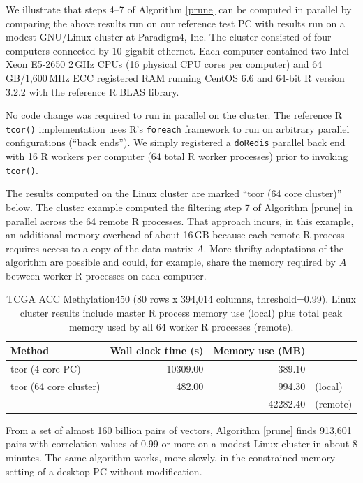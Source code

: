 \documentclass{article}
\let\proglang=\textsf
\numberwithin{algorithmctr}{section}
\begin{document}
We illustrate that steps 4--7 of Algorithm \ref{prune} can be computed in
parallel by comparing the above results run on our reference test PC with
results run on a modest GNU/Linux cluster at Paradigm4, Inc. The cluster
consisted of four computers connected by 10 gigabit ethernet. Each computer
contained two Intel Xeon E5-2650 2$\,$GHz CPUs (16 physical CPU cores per
computer) and 64$\,$GB/1,600$\,$MHz ECC registered RAM running CentOS 6.6 and
64-bit \proglang{R} version 3.2.2 with the reference \proglang{R} BLAS library.

No code change was required to run in parallel on the cluster. The reference \proglang{R}
{\tt tcor()} implementation uses \proglang{R}'s {\tt foreach} \cite{foreach} framework to
run on arbitrary parallel configurations (``back ends''). We simply registered
a {\tt doRedis} \cite{doredis} parallel back end with 16 \proglang{R} workers per computer
(64 total \proglang{R} worker processes) prior to invoking {\tt tcor()}.

The results computed on the Linux cluster are marked ``tcor (64 core cluster)''
below. The cluster example computed the filtering step 7 of Algorithm
\ref{prune} in parallel across the 64 remote \proglang{R} processes. That approach incurs,
in this example, an additional memory overhead of about 16$\,$GB because each
remote \proglang{R} process requires access to a copy of the data matrix $A$. More thrifty
adaptations of the algorithm are possible and could, for example, share the
memory required by $A$ between worker \proglang{R} processes on each computer.

\begin{table}[ht]
\centering
{\small
\begin{tabular}{lrrl}
  \hline
Method & Wall clock time (s) & Memory use (MB) &   \\ 
  \hline
tcor (4 core PC) & 10309.00 & 389.10 &  \\ 
  tcor (64 core cluster) & 482.00 & 994.30 & (local) \\ 
   &  & 42282.40 & (remote) \\ 
   \hline
\end{tabular}
}
\caption{TCGA ACC Methylation450 (80 rows x 394,014 columns, threshold=0.99). Linux cluster results include master R process memory use (local) plus total peak memory used by all 64 worker R processes (remote).} 
\label{TCGA3}
\end{table}From a set of almost 160 billion pairs of vectors, Algorithm \ref{prune} finds 913,601
pairs with correlation values of 0.99 or more on a modest Linux
cluster in about 8 minutes. The same algorithm works, more slowly, in
the constrained memory setting of a desktop PC without modification.
\end{document}
